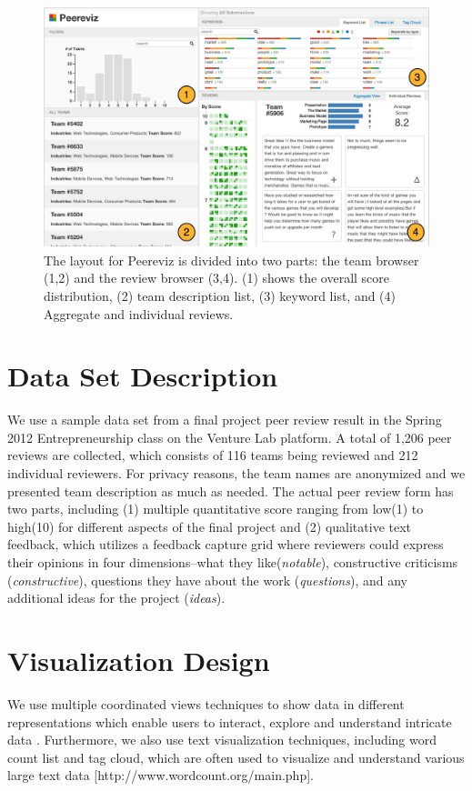 \documentclass{sigchi}
\begin{document}
\begin{figure}[ht]
\centering
\includegraphics[width=2.0\columnwidth]{images/overview-annotated}
\caption{The layout for Peereviz is divided into two parts:
the team browser (1,2) and the review browser (3,4).
(1) shows the overall score distribution,
(2) team description list,
(3) keyword list, and
(4) Aggregate and individual reviews.}
\label{fig:overview-annotated}
\end{figure}

\section{Data Set Description}
We use a sample data set from a final project peer review result in the Spring
2012 Entrepreneurship class on the Venture Lab platform. A total of 1,206 peer
reviews are collected, which consists of 116 teams being reviewed and 212
individual reviewers. For privacy reasons, the team names are anonymized and we
presented team description as much as needed. The actual peer review form has
two parts, including (1) multiple quantitative score ranging from low(1) to
high(10) for different aspects of the final project and (2) qualitative text
feedback, which utilizes a feedback capture grid \cite{dbootcamp} where
reviewers could express their opinions in four dimensions–what they
like(\emph{notable}), constructive criticisms (\emph{constructive}), questions
they have about the work (\emph{questions}), and any additional ideas for the
project (\emph{ideas}).



\section{Visualization Design}
We use multiple coordinated views techniques to
show data in different representations which enable users to interact, explore
and understand intricate data \cite{State-of-the-art}. Furthermore, we also
use text visualization techniques, including word count list and tag cloud,
which are often used to visualize and understand various large text data
\cite{TagClouds} [http://www.wordcount.org/main.php].
\end{document}
